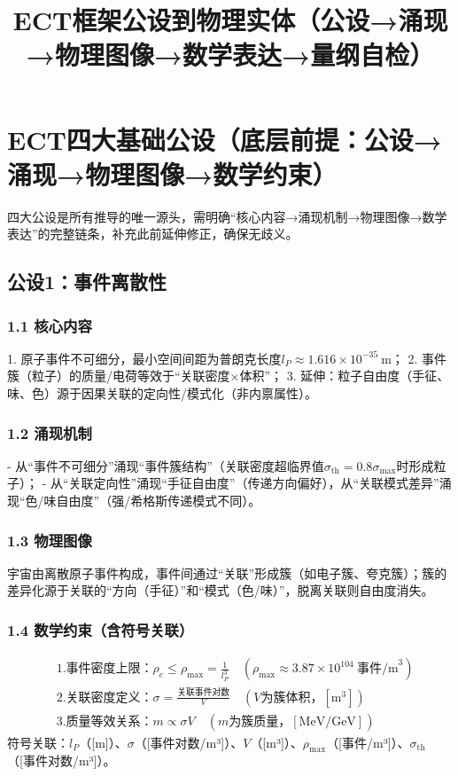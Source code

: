 \documentclass{article}
\title{ECT框架公设到物理实体（公设→涌现→物理图像→数学表达→量纲自检）}
\author{}
\date{}
\begin{document}
\maketitle

\section{ECT四大基础公设（底层前提：公设→涌现→物理图像→数学约束）}
四大公设是所有推导的唯一源头，需明确“核心内容→涌现机制→物理图像→数学表达”的完整链条，补充此前延伸修正，确保无歧义。

\subsection{公设1：事件离散性}
\subsubsection{1.1 核心内容}
1. 原子事件不可细分，最小空间间距为普朗克长度\(l_P \approx 1.616 \times 10^{-35}\ \text{m}\)；  
2. 事件簇（粒子）的质量/电荷等效于“关联密度×体积”；  
3. 延伸：粒子自由度（手征、味、色）源于因果关联的定向性/模式化（非内禀属性）。

\subsubsection{1.2 涌现机制}
- 从“事件不可细分”涌现“事件簇结构”（关联密度超临界值\(\sigma_{\text{th}}=0.8\sigma_{\text{max}}\)时形成粒子）；  
- 从“关联定向性”涌现“手征自由度”（传递方向偏好），从“关联模式差异”涌现“色/味自由度”（强/希格斯传递模式不同）。

\subsubsection{1.3 物理图像}
宇宙由离散原子事件构成，事件间通过“关联”形成簇（如电子簇、夸克簇）；簇的差异化源于关联的“方向（手征）”和“模式（色/味）”，脱离关联则自由度消失。

\subsubsection{1.4 数学约束（含符号关联）}
\begin{align*}
&1. \text{事件密度上限：}\rho_e \leq \rho_{\text{max}} = \frac{1}{l_P^3} \quad (\rho_{\text{max}} \approx 3.87 \times 10^{104}\ \text{事件/m}^3) \\
&2. \text{关联密度定义：}\sigma = \frac{\text{关联事件对数}}{V} \quad (V为簇体积，[\text{m}^3]) \\
&3. \text{质量等效关系：}m \propto \sigma V \quad (m为簇质量，[\text{MeV/GeV}])
\end{align*}
符号关联：\(l_P\)（[m]）、\(\sigma\)（[事件对数/m³]）、\(V\)（[m³]）、\(\rho_{\text{max}}\)（[事件/m³]）、\(\sigma_{\text{th}}\)（[事件对数/m³]）。
\end{document}

